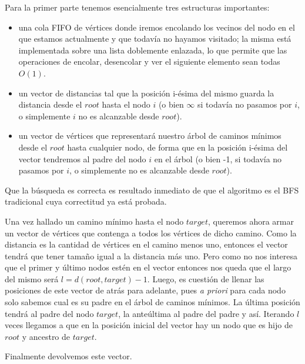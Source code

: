 Para la primer parte tenemos esencialmente tres estructuras importantes: 
\begin{itemize}
\item una cola FIFO de vértices donde iremos encolando los vecinos del nodo en el que estamos actualmente y que todavía no hayamos visitado; la misma está implementada sobre una lista doblemente enlazada, lo que permite que las operaciones de encolar, desencolar y ver el siguiente elemento sean todas $O(1)$.
\item un vector de distancias tal que la posición i-ésima del mismo guarda la distancia desde el $root$ hasta el nodo $i$ (o bien $\infty$ si todavía no pasamos por $i$, o simplemente $i$ no es alcanzable desde $root$).
\item un vector de vértices que representará nuestro árbol de caminos mínimos desde el $root$ hasta cualquier nodo, de forma que en la posición i-ésima del vector tendremos al padre del nodo $i$ en el árbol (o bien -1, si todavía no pasamos por $i$, o simplemente no es alcanzable desde $root$).
\end{itemize}

Que la búsqueda es correcta es resultado inmediato de que el algoritmo es el BFS tradicional cuya correctitud ya está probada.

Una vez hallado un camino mínimo hasta el nodo $target$, queremos ahora armar un vector de vértices que contenga a todos los vértices de dicho camino. Como la distancia es la cantidad de vértices en el camino menos uno, entonces el vector tendrá que tener tamaño igual a la distancia más uno. Pero como no nos interesa que el primer y último nodos estén en el vector entonces nos queda que el largo del mismo será $l=d(root, target) - 1$. Luego, es cuestión de llenar las posiciones de este vector de atrás para adelante, pues \emph{a priori} para cada nodo solo sabemos cual es su padre en el árbol de caminos mínimos. La última posición tendrá al padre del nodo $target$, la anteúltima al padre del padre y así. Iterando $l$ veces llegamos a que en la posición inicial del vector hay un nodo que es hijo de $root$ y ancestro de $target$.

Finalmente devolvemos este vector.

